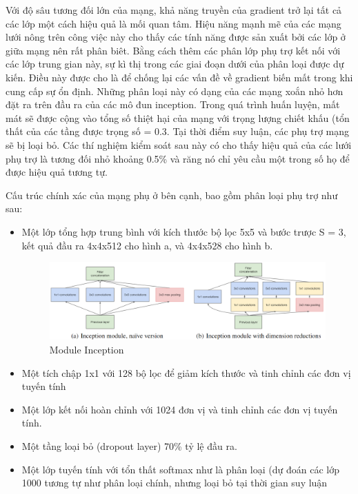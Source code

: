 Với độ sâu  tương đối lớn của mạng, khả năng truyền của gradient trở lại tất cả các lớp một cách hiệu quả là mối quan tâm. Hiệu năng mạnh mẽ của các mạng lưới nông trên công việc này cho thấy các tính năng được sản xuất bởi các lớp ở giữa mạng nên rất phân biêt. Bằng cách thêm các phân lớp phụ trợ kết nối với các lớp trung gian này, sự kì thị trong các giai đoạn dưới của phân loại được dự kiến. Điều này được cho là để chống lại các vấn đề về gradient biến mất trong khi cung cấp sự ổn định. Những phân loại này có dạng của các mạng xoắn nhỏ hơn đặt ra trên đầu ra của các mô đun inception. Trong quá trình huấn luyện, mất mát sẽ được cộng vào tổng số thiệt hại của mạng với trọng  lượng chiết khấu (tổn thất của các tầng được trọng số = 0.3. Tại thời điểm suy luận, các phụ trợ mạng sẽ bị loại bỏ. Các thí nghiệm kiểm soát sau này có cho thấy hiệu quả của các lưới phụ trợ là tương đối nhỏ khoảng 0.5\% và răng nó chỉ yêu cầu một trong số họ để được hiệu quả tương tự.

Cấu trúc chính xác của mạng phụ ở bên cạnh, bao gồm phân loại phụ trợ như sau:
\begin{itemize}


\item Một lớp tổng hợp trung bình với kích thước bộ lọc 5x5 và bước trược S = 3, kết quả đầu ra 4x4x512 cho hình a, và 4x4x528 cho hình b. 
\begin{center}
    \begin{figure}[h!]
    \begin{center}
     \includegraphics[scale=0.4]{img/inception_1x1.png}
    \end{center}
    \caption{Module Inception \cite{renset}}
    \label{refhinh11}
    \end{figure}
\end{center}
\item Một tích chập 1x1 với 128 bộ lọc để giảm kích thước và tinh chỉnh các đơn vị tuyến tính
\item Một lớp kết nối hoàn chỉnh với 1024 đơn vị và tinh chỉnh các đơn vị tuyến tính.
\item Một tầng loại bỏ (dropout layer) 70\% tỷ lệ đầu ra.
\item Một lớp tuyến tính với tổn thất softmax như là phân loại (dự đoán các lớp 1000 tương tự như phân loại chính, nhưng loại bỏ tại thời gian suy luận  
\end{itemize}

